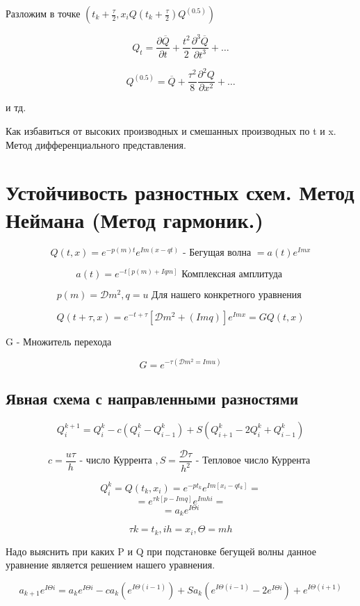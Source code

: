 \documentclass[14pt]{extarticle}
\begin{document}
Разложим в точке $ (t_k + \frac{\tau }{2}, x_i Q (t_k + \frac{\tau }{2}) Q^(0.5)) $

\[ Q_t = \frac{\partial \overline{Q }}{\partial t } + \frac{t^2}{2} \frac{\partial^3 \overline{Q  }}{\partial t^3 } + \dots \]

\[ Q^{(0.5)} = \overline{Q} +\frac{\tau^2}{8} \frac{\partial^2 Q}{\partial x ^2} + \dots \]

и тд.

Как избавиться от высоких производных и смешанных производных по t и x. Метод дифференциального представления.

\section{Устойчивость разностных схем. Метод Неймана (Метод гармоник.)}

\[ Q(t, x) = e^{-p(m)t} e^{Im(x-qt)} \textrm{ - Бегущая волна } = a(t) e^{I m x}\]

\[ a(t) = e^{-t [ p(m) + I q m]} \textrm{ Комплексная амплитуда }\]

\[ p(m) = \mathcal{D} m^2, q=u \textrm{ Для нашего конкретного уравнения } \]

\[ Q(t + \tau, x) = e^{-t + \tau}[\mathcal{D}m^2 + (I m q)] e^{Imx} = G Q (t,x) \]

G - Множитель перехода

\[ G = e^{- \tau (\mathcal{D} m^2 = I m u)}  \]

\subsection{Явная схема с направленными разностями}

\[ Q^{k+1}_i = Q^k_i - c(Q^k_i - Q^k_{i-1}) + S (Q^k_{i+1} - 2 Q_i^k + Q^k_{i-1}) \]

\[ c = \frac{u \tau}{h} \textrm{ - число Куррента }, S = \frac{\mathcal{D } \tau }{h^2} \textrm{ - Тепловое число Куррента }\]

\[ Q^k_i = Q (t_k, x_i) = e^{-pt_k} e^{Im [x_i - q t_k]} = \]
\[ = e^{\tau k [ p - I m q]} e^{I m h i} =  \]
\[ = a_k e^{I \Theta i}\]

\[ \tau k = t_k, ih = x_i, \Theta = m h \]

Надо выяснить при каких P и Q при подстановке бегущей волны данное уравнение является решением нашего уравнения.

\[ a_{k+1} e^{I \Theta i} = a_k e^{I \Theta i} - c a_k (e^{I \Theta (i-1)}) + S a_k (e^{I \Theta (i-1)} - 2e^{I \Theta i }) + e^{I \Theta(i+1)} \]
\end{document}
